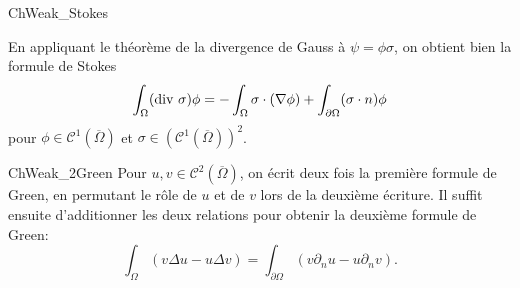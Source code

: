 \newpage

\begin{corrige}{ChWeak_Stokes}

En appliquant le théorème de la divergence de Gauss à $\psi = \phi \sigma$, on obtient bien la 
{formule de Stokes}
\[
\int_\Omega ( \hbox{div } \sigma ) \phi 
= 
- \int_\Omega \sigma \cdot ( \nabla \phi ) 
+ \int_{\partial \Omega} (\sigma \cdot n) \phi
\]
pour $\phi \in \mathcal{C}^1(\overline{\Omega})$ et $\sigma \in ( \mathcal{C}^1(\overline{\Omega}) )^2$. 

\end{corrige}

\medskip

\begin{corrige}{ChWeak_2Green}
Pour $u,v \in \mathcal{C}^2(\overline{\Omega})$, on écrit deux fois la première formule de Green, en permutant le rôle de $u$ et de $v$ lors de la deuxième écriture. Il suffit ensuite d'additionner les deux relations pour obtenir la
{deuxième formule de Green}:
\[
\int_\Omega ( v \Delta u  - u \Delta v ) = 
\int_{\partial \Omega} ( v \partial_n u - u \partial_n v ).
\]

\end{corrige}

\medskip

